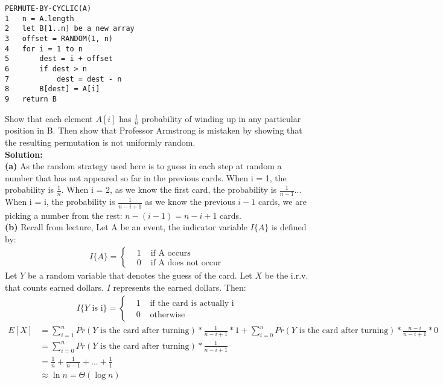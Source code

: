 \documentclass{article}
\begin{document}
\begin{verbatim}
PERMUTE-BY-CYCLIC(A)
1   n = A.length
2   let B[1..n] be a new array
3   offset = RANDOM(1, n)
4   for i = 1 to n
5       dest = i + offset
6       if dest > n
7           dest = dest - n
8       B[dest] = A[i]
9   return B
\end{verbatim}
Show that each element $A[i]$ has $\frac{1}{n}$ probability of winding up in any particular position in B. Then show that Professor Armstrong is mistaken by showing that the resulting permutation is not uniformly random.\\
\textbf{Solution:}\\
\textbf{(a)} As the random strategy used here is to guess in each step at random a number that has not appeared so far in the previous cards. When i = 1, the probability is $\frac{1}{n}$. When i = 2, as we know the first card, the probability is $\frac{1}{n-1}$... When i = i, the probability is $\frac{1}{n-i+1}$ as we know the previous $i-1$ cards, we are picking a number from the rest: $n-(i-1)= n-i+1$ cards.\\
\textbf{(b)} Recall from lecture, Let A be an event, the indicator variable $I\{A\}$ is defined by:
\begin{align*}
    I\{A\}=\left\{\begin{matrix} 
  &1 &\text{ if A occurs}\\  
  &0 &\text{ if A does not occur}
\end{matrix}\right. 
\end{align*}
Let $Y$ be a random variable that denotes the guess of the card. Let $X$ be the i.r.v. that counts earned dollars. $I$ represents the earned dollars. Then:
\begin{align*}
    I\{Y \text{ is i} \}=\left\{\begin{matrix} 
  &1 &\text{ if the card is actually i}\\  
  &0 &\text{ otherwise}
\end{matrix}\right. 
\end{align*}
\begin{align*}
    E[X] &= \sum_{i=1}^{n} Pr(Y \text{ is the card after turning})*\frac{1}{n-i+1}*1 + \sum_{i=0}^{n} Pr(Y \text{ is the card after turning})*\frac{n-i}{n-i+1}*0\\
    &= \sum_{i=0}^{n} Pr(Y \text{ is the card after turning})*\frac{1}{n-i+1}\\
    &= \frac{1}{n} + \frac{1}{n-1} + \text{...} + \frac{1}{1}\\
    &\approx \ln n = \Theta(\log n)
\end{align*}
\end{document}

